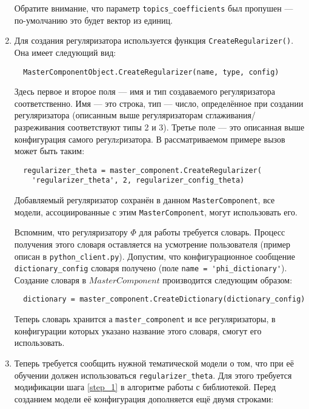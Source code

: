 \begin{enumerate}
	Обратите внимание, что параметр \verb|topics_coefficients| был пропушен --- по-умолчанию это будет вектор из единиц.
	
	\item Для создания регуляризатора используется функция \verb|CreateRegularizer()|. Она имеет следующий вид:
	
	\vspace{4pt}	
	\verb|  MasterComponentObject.CreateRegularizer(name, type, config)|
	\vspace{4pt}	
	
	Здесь первое и второе поля --- имя и тип создаваемого регуляризатора соответственно. Имя --- это строка, тип --- число, определённое при создании регуляризатора (описанным выше регуляризаторам сглаживания/разреживания соответствуют типы 2 и 3). Третье поле --- это описанная выше конфигурация самого регулzризатора. В рассматриваемом примере вызов может быть таким:
	
	\vspace{4pt}	
	\verb|  regularizer_theta = master_component.CreateRegularizer(| \\
	\verb|    'regularizer_theta', 2, regularizer_config_theta)|
	\vspace{4pt}	
	
	Добавляемый регуляризатор сохранён в данном \verb|MasterComponent|, все модели, ассоциированные с этим \verb|MasterComponent|, могут использовать его.	
	
	Вспомним, что регуляризатору $\Phi$ для работы требуется словарь. Процесс получения этого словаря оставляется на усмотрение пользователя (пример описан в \verb|python_client.py|). Допустим, что конфигурационное сообщение \verb|dictionary_config| словаря получено (поле \verb|name = 'phi_dictionary'|). Создание словаря в $MasterComponent$ производится следующим образом:

	\vspace{4pt}
	\verb|  dictionary = master_component.CreateDictionary(dictionary_config)|
	\vspace{4pt}
	
	Теперь словарь хранится а \verb|master_component| и все регуляризаторы, в конфигурации которых указано название этого словаря, смогут его использовать.	
	
	\item Теперь требуется сообщить нужной тематической модели о том, что при её обучении должен использоваться \verb|regularizer_theta|. Для этого требуется модификации шага \ref{step_1} в алгоритме работы с библиотекой. Перед созданием модели её конфигурация дополняется ещё двумя строками:
	

\end{enumerate}
